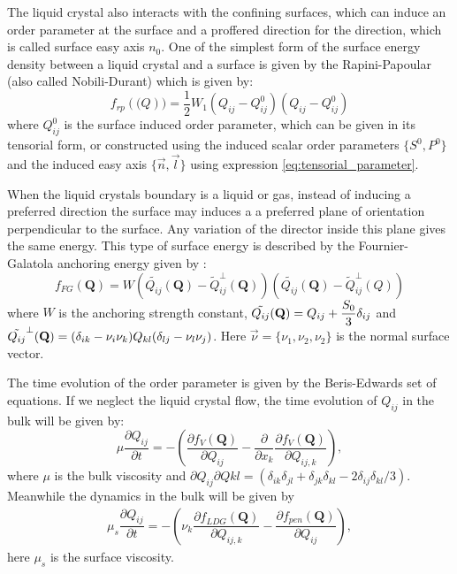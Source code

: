 \documentclass[final,5p,times,twocolumn]{elsarticle}
\begin{document}
The liquid crystal also interacts with the confining surfaces, which
can induce an order parameter at the surface and a proffered direction
for the direction, which is called surface easy axis $n_0$. One of the
simplest form of the surface energy density between a liquid crystal
and a surface is given by the Rapini-Papoular (also called Nobili-Durant) which is given by:
\begin{equation}
  f_{rp}(\mathbf(Q))=\dfrac{1}{2} W_1 (Q_{ij}-Q^0_{ij}) (Q_{ij}-Q^0_{ij})
\end{equation}
where $Q_{ij}^0$ is the surface induced order parameter, which can be
given in its tensorial form, or constructed using the induced scalar
order parameters $\lbrace S^0, P^0 \rbrace$ and the induced easy axis
$\lbrace \vec{n}, \vec{l} \rbrace$ using expression
\ref{eq:tensorial_parameter}.

When the liquid crystals boundary is a liquid or gas, instead of
inducing a preferred direction the surface may induces a a preferred
plane of orientation perpendicular to the surface. Any variation of
the director inside this plane gives the same energy. This type of
surface energy is described by the Fournier-Galatola anchoring energy
given by \cite{Sec2012}:
\begin{equation} \label{eq:penalizacao}
f_{FG}(\mathbf{Q})=W\left( \tilde{Q_{ij}}(\mathbf{Q}) - \tilde{Q}_{ij}^{\perp}(\mathbf{Q}) \right)\left( \tilde{Q_{ij}}(\mathbf{Q}) - \tilde{Q}_{ij}^{\perp}(\mathbf{}{Q}) \right)
\end{equation}
where $W$ is the anchoring strength constant,
$\tilde{Q_{ij}}(\bold{Q})=Q_{ij}+\dfrac{S_0}{3} \delta_{ij}$ and
$\tilde{Q_{ij}}^{\perp}(\bold{Q})=(\delta_{ik}-\nu_i \nu_k)Q_{kl}
(\delta_{lj}-\nu_l \nu_j)$. Here $\vec{\nu}=\lbrace\nu_1,\nu_2,\nu_2 \rbrace$ is the normal surface vector.

The time evolution of the order parameter is given by the
Beris-Edwards set of equations. If we neglect the liquid crystal flow,
the time evolution of $Q_{ij}$ in the bulk will be given by:
\begin{equation} \label{eq:dissipacao_Q}
\mu \dfrac{\partial Q_{ij}}{ \partial t} = -\left( \dfrac{\partial f_{V}(\mathbf{Q})}{\partial Q_{ij}} - \dfrac{\partial}{\partial x_k } \dfrac{\partial f_V(\mathbf{Q})}{\partial Q_{ij,k}}  \right),
\end{equation}
%
where $\mu$ is the bulk viscosity and $ \partial Q_{ij} \partial Q{kl} = (\delta_{ik} \delta_{jl}+\delta_{jk} \delta_{kl}-2 \delta_{ij} \delta_{kl}/3)$. Meanwhile the dynamics in the bulk will be given by
\begin{align}
\mu_s \dfrac{\partial Q_{ij}}{\partial t}=-\left(\nu_k\dfrac{\partial f_{LDG}(\mathbf{Q})}{\partial Q_{ij,k}} -\dfrac{\partial f_{pen}(\mathbf{Q})}{\partial Q_{ij}}\right),
\end{align}
here $\mu_s$ is the surface viscosity.
\end{document}

